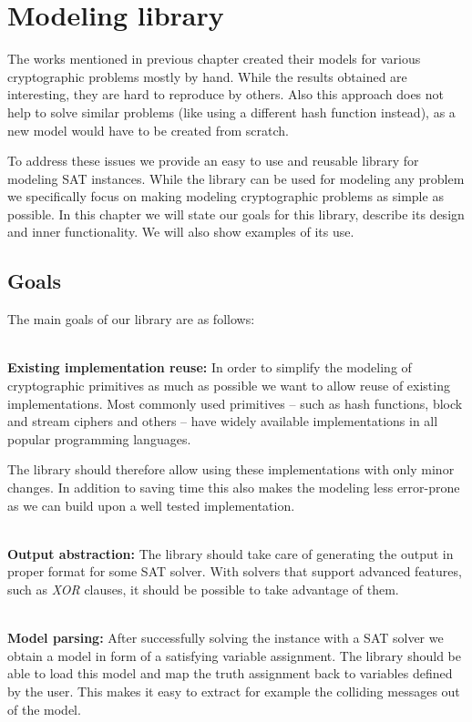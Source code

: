 \chapter{Modeling library}

The works mentioned in previous chapter created their models for various cryptographic problems mostly by hand.
While the results obtained are interesting, they are hard to reproduce by others.
Also this approach does not help to solve similar problems (like using a different hash function instead), as a new model would have to be created from scratch.

To address these issues we provide an easy to use and reusable library for modeling SAT instances.
While the library can be used for modeling any problem we specifically focus on making modeling cryptographic problems as simple as possible.
In this chapter we will state our goals for this library, describe its design and inner functionality.
We will also show examples of its use.

\section{Goals}
The main goals of our library are as follows:

~\\
\textbf{Existing implementation reuse:}
In order to simplify the modeling of cryptographic primitives as much as possible we want to allow reuse of existing implementations.
Most commonly used primitives -- such as hash functions, block and stream ciphers and others -- have widely available implementations in all popular programming languages.

The library should therefore allow using these implementations with only minor changes.
In addition to saving time this also makes the modeling less error-prone as we can build upon a well tested implementation.

~\\
\textbf{Output abstraction:}
The library should take care of generating the output in proper format for some SAT solver.
With solvers that support advanced features, such as \emph{XOR} clauses, it should be possible to take advantage of them.

~\\
\textbf{Model parsing:}
After successfully solving the instance with a SAT solver we obtain a model in form of a satisfying variable assignment.
The library should be able to load this model and map the truth assignment back to variables defined by the user.
This makes it easy to extract for example the colliding messages out of the model.


